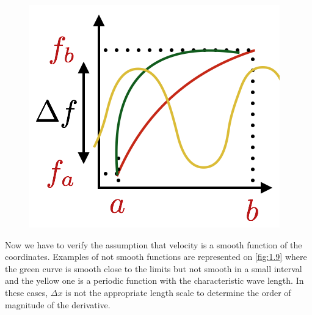 		\begin{figure}
		\vspace{-8mm}
		\includegraphics[scale=0.53]{ch1/9}
		\label{fig:1.9}
		\end{figure}
		Now we have to verify the assumption that velocity is a smooth function of the coordinates. Examples of not smooth functions are represented on \autoref{fig:1.9} where the green curve is smooth close to the limits but not smooth in a small interval and the yellow one is a periodic function with the characteristic wave length. In these cases, $\Delta x$ is not the appropriate length scale to determine the order of magnitude of the derivative. \\\\\\

